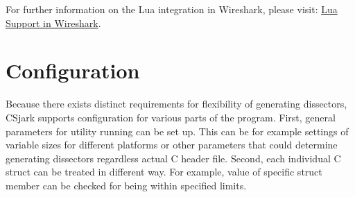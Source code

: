 \documentclass[A4paper,10pt,english]{sphinxmanual}
\begin{document}
For further information on the Lua integration in Wireshark, please visit:
\href{http://www.wireshark.org/docs/wsug\_html\_chunked/wsluarm.html}{Lua Support in Wireshark}.


\section{Configuration}
\label{user/config:configuration}\label{user/config::doc}
Because there exists distinct requirements for flexibility of generating dissectors, CSjark supports configuration for various parts of the program. First, general parameters for utility running can be set up. This can be for example settings of variable sizes for different platforms or other parameters that could determine generating dissectors regardless actual C header file. Second, each individual C struct can be treated in different way. For example, value of specific struct member can be checked for being within specified limits.
\end{document}
